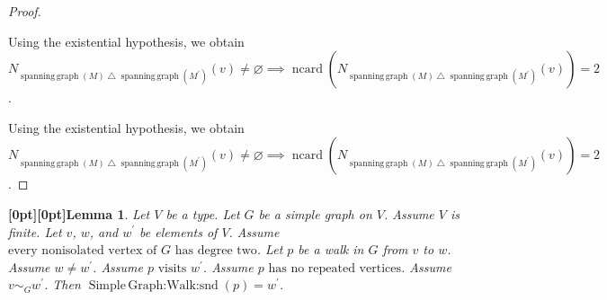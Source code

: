 \documentclass{article}
\makeatletter
\newcommand{\paperanchor}[1]{\hypertarget{#1}{}}%
\def\paperdest{\pdfextension dest}\def\paperstart{\pdfextension startlink}%
\def\paperend{\pdfextension endlink}\def\papercolor{\pdfextension colorstack}%
\let\paperdest\pdfdest\let\paperstart\pdfstartlink\let\paperend\pdfendlink\let\papercolor\pdfcolorstack
\newcommand{\paperanchor}[1]{\paperdest name{#1} xyz}%
\newcommand{\paperanchor}[1]{\special{pdf:dest (#1) [@thispage /XYZ null @ypos null]}}%
\newcommand{\paperlineanchor}[1]{\raisebox{10pt}[0pt][0pt]{\paperanchor{#1}}}
\DeclareRobustCommand{\paperresultname}[1]{\paperlineanchor{theorem:\arabic{theorem}}#1}
\theoremstyle{paperresult}
\newtheorem{lemma}[theorem]{\paperresultname{Lemma}}
\newenvironment{proofstep}{\par\smallskip\ifdim\leftskip<3em\relax\advance\leftskip by 1em\relax\fi\noindent\ignorespaces}{\par\smallskip}
\makeatother
\begin{document}
\begin{proof}
\begin{proofstep}
\begin{proofstep}
\end{proofstep}
Using the existential hypothesis, we obtain \(N_{\operatorname{spanning\,graph}(M) \mathbin{\triangle} \operatorname{spanning\,graph}(M^{'})}(v)\ne\varnothing \implies \operatorname{ncard}(N_{\operatorname{spanning\,graph}(M) \mathbin{\triangle} \operatorname{spanning\,graph}(M^{'})}(v)) = 2\).
\end{proofstep}
Using the existential hypothesis, we obtain \(N_{\operatorname{spanning\,graph}(M) \mathbin{\triangle} \operatorname{spanning\,graph}(M^{'})}(v)\ne\varnothing \implies \operatorname{ncard}(N_{\operatorname{spanning\,graph}(M) \mathbin{\triangle} \operatorname{spanning\,graph}(M^{'})}(v)) = 2\).
\end{proof}

\begin{lemma}\label{theorem:37}
Let \(V\) be a type. Let \(G\) be a simple graph on \(V\). Assume \(V\) is finite. Let \(v\), \(w\), and \(w^{'}\) be elements of \(V\). Assume \(\text{every nonisolated vertex of }G\text{ has degree two}\). Let \(p\) be a walk in \(G\) from \(v\) to \(w\). Assume \(w \ne w^{'}\). Assume \(p\text{ visits }w^{'}\). Assume \(p\text{ has no repeated vertices}\). Assume \(v \sim_{G} w^{'}\). Then \(\operatorname{Simple\,Graph\mathord{:}Walk\mathord{:}snd}\left(p\right) = w^{'}\).
\end{lemma}
\end{document}
